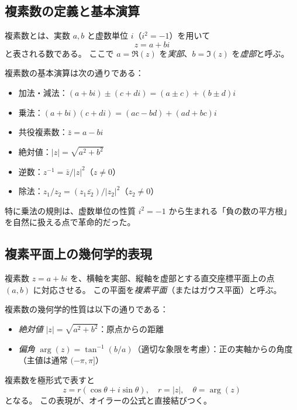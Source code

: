 \documentclass[dvipdfmx,a4paper]{jsbook}
\theoremstyle{definition}
\theoremstyle{remark}
\begin{document}
\subsection{複素数の定義と基本演算}

複素数とは、実数 $a, b$ と虚数単位 $i$（$i^2 = -1$）を用いて
\begin{equation}
  z = a + bi
\end{equation}
と表される数である。
ここで $a = \Re(z)$ を\emph{実部}、$b = \Im(z)$ を\emph{虚部}と呼ぶ。

複素数の基本演算は次の通りである：
\begin{itemize}
  \item 加法・減法：$(a + bi) \pm (c + di) = (a \pm c) + (b \pm d)i$
  \item 乗法：$(a + bi)(c + di) = (ac - bd) + (ad + bc)i$
  \item 共役複素数：$\bar{z} = a - bi$
  \item 絶対値：$|z| = \sqrt{a^2 + b^2}$
  \item 逆数：$z^{-1} = \bar{z} / |z|^2$（$z \neq 0$）
  \item 除法：$z_1 / z_2 = (z_1 \bar{z_2}) / |z_2|^2$（$z_2 \neq 0$）
\end{itemize}

特に乗法の規則は、虚数単位の性質 $i^2 = -1$ から生まれる「負の数の平方根」を自然に扱える点で革命的だった。

\subsection{複素平面上の幾何学的表現}

複素数 $z = a + bi$ を、横軸を実部、縦軸を虚部とする直交座標平面上の点 $(a, b)$ に対応させる。
この平面を\emph{複素平面}（またはガウス平面）と呼ぶ。

複素数の幾何学的性質は以下の通りである：
\begin{itemize}
  \item \emph{絶対値} $|z| = \sqrt{a^2 + b^2}$：原点からの距離
  \item \emph{偏角} $\arg(z) = \tan^{-1}(b/a)$（適切な象限を考慮）：正の実軸からの角度（主値は通常 $(-\pi, \pi]$）
\end{itemize}

複素数を極形式で表すと
\begin{equation}
  z = r (\cos\theta + i \sin\theta), \quad r = |z|, \quad \theta = \arg(z)
  \label{eq:polar-form}
\end{equation}
となる。
この表現が、オイラーの公式と直接結びつく。
\end{document}
